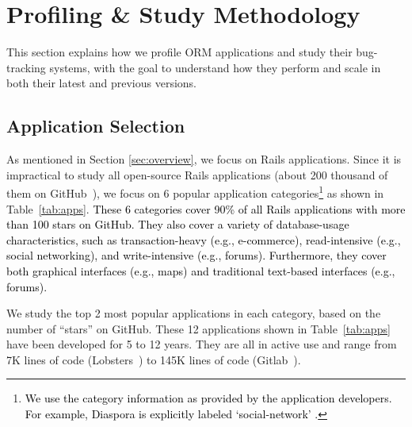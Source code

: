

\section{Profiling \& Study Methodology}
\label{sec:methodology}

This section explains how we profile ORM applications and study their bug-tracking systems, with the goal to understand how they perform and scale in both their latest and previous versions.

\subsection{Application Selection}

As mentioned in Section \ref{sec:overview}, we focus on Rails applications.
Since it is impractical to study all open-source Rails applications (about 200 thousand of them on GitHub~\cite{github}), we focus on 6 popular application categories\footnote{\textcolor{black}{We use the category information as provided by the application developers. For example, Diaspora is explicitly labeled  `social-network' \cite{diaspora}.}}
as shown in Table~\ref{tab:apps}. \textcolor{black}{These 6 categories cover 90\% of all Rails applications with more than 100 stars on GitHub.  They also cover a variety of database-usage characteristics, such as transaction-heavy (e.g., e-commerce), read-intensive (e.g., social networking), and 
write-intensive (e.g., forums). Furthermore, %
 they cover both graphical interfaces (e.g., maps) and traditional text-based interfaces (e.g., forums).}

We study the top 2 most popular applications in each category, based on the number of ``stars'' on GitHub. These 12 applications shown in Table~\ref{tab:apps}
have been developed for 5 to 12 years. They are all in active use and range from 7K lines of code (Lobsters~\cite{lobsters}) to 
145K lines of code (Gitlab~\cite{gitlab}).




